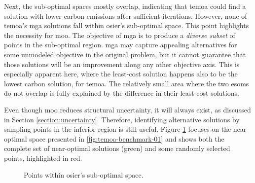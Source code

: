 Next, the sub-optimal spaces mostly overlap, indicating that \ac{temoa} could
find a solution with lower carbon emissions after sufficient iterations.
However, none of \ac{temoa}'s \ac{mga} solutions fall within \ac{osier}'s
sub-optimal space. This point highlights the necessity for \acl{moo}. The
objective of \ac{mga} is to produce a \textit{diverse subset} of points in the
sub-optimal region. \ac{mga} may capture appealing alternatives for some
unmodeled objective in the original problem, but it cannot guarantee that those
solutions will be an improvement along any other objective axis. This is
especially apparent here, where the least-cost solution happens also to be the
lowest carbon solution, for \ac{temoa}. The relatively small area where the two
\acp{esom} do not overlap is fully explained by the difference in their
least-cost solutions.

Even though \ac{moo} reduces structural uncertainty, it will always exist, as
discussed in Section \ref{section:uncertainty}. Therefore, identifying
alternative solutions by sampling points in the inferior region is still useful.
Figure \ref{fig:temoa-benchmark-02} focuses on the near-optimal space presented
in \ref{fig:temoa-benchmark-01} and shows both the complete set of near-optimal
solutions (green) and some randomly selected points, highlighted in red.

\begin{figure}[h]
  \centering
  \resizebox{0.75\columnwidth}{!}{}
  \caption{Points within \ac{osier}'s sub-optimal space.}
  \label{fig:temoa-benchmark-02}
\end{figure}

